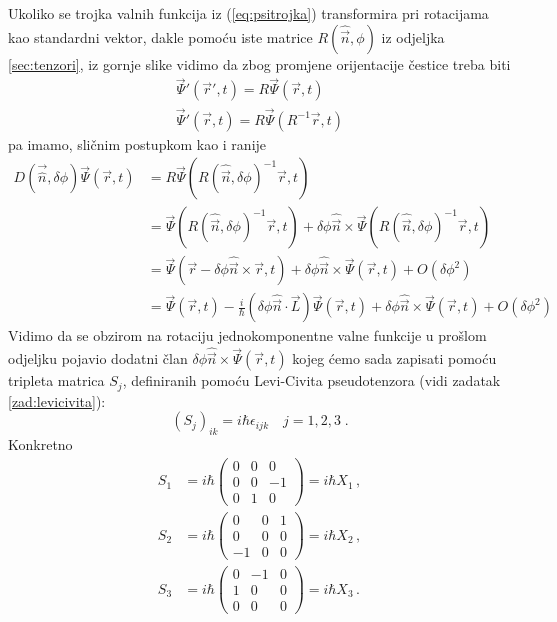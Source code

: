 Ukoliko se trojka valnih funkcija iz (\ref{eq:psitrojka}) transformira
pri rotacijama kao standardni vektor, dakle pomoću iste matrice $R(\hat{\vec{n}}, \phi)$
iz odjeljka \ref{sec:tenzori}, iz gornje slike vidimo da zbog promjene
orijentacije čestice treba biti
\begin{gather*}
\vec{\Psi}'(\vec{r}',t)=R \vec{\Psi}(\vec{r},t) \\
\vec{\Psi}'(\vec{r},t)=R \vec{\Psi}(R^{-1}\vec{r},t) 
\end{gather*}
pa imamo, sličnim postupkom kao i ranije
\begin{equation*}
\begin{split}
D(\vec{\hat{n}},\delta\phi)\vec{\Psi}(\vec{r}, t)&=
 R \vec{\Psi}(R(\hat{\vec{n}},\delta \phi)^{-1}
\vec{r}, t) \\
 &=\vec{\Psi}(R(\hat{\vec{n}}, \delta\phi)^{-1}\vec{r}, t)+
\delta\phi \hat{\vec{n}}\times\vec{\Psi}(
R(\hat{\vec{n}}, \delta\phi)^{-1}\vec{r},t) \\
 &=\vec{\Psi}(\vec{r}-\delta\phi\hat{\vec{n}}\times\vec{r}, t)+
\delta\phi \hat{\vec{n}}\times\vec{\Psi}(\vec{r},t) + O(\delta\phi^2) \\
 &= \vec{\Psi}(\vec{r}, t)-\frac{i}{\hbar}(\delta\phi\hat{\vec{n}}\cdot
  \vec{L})\vec{\Psi}(\vec{r}, t)+
\delta\phi \hat{\vec{n}}\times\vec{\Psi}(\vec{r},t) + O(\delta\phi^2)
\end{split}
\end{equation*}
Vidimo da se obzirom na rotaciju jednokomponentne valne funkcije u prošlom
odjeljku pojavio dodatni član $\delta\phi \hat{\vec{n}}\times\vec{\Psi}(\vec{r},t)$
kojeg ćemo sada zapisati pomoću tripleta matrica $S_{j}$,
definiranih pomoću Levi-Civita pseudotenzora (vidi zadatak \ref{zad:levicivita}):
\begin{equation}
(S_j)_{ik} = i\hbar\epsilon_{ijk} \quad j=1,2,3 \;.
\end{equation}
Konkretno
\begin{align}
S_1& =i\hbar
\begin{pmatrix}
0 & 0 & 0 \\
0 & 0 &-1 \\
0 & 1 & 0
\end{pmatrix} = i\hbar X_1 \,,\\
S_2& = i\hbar
\begin{pmatrix}
0 & 0 & 1 \\
0 & 0 & 0 \\
-1 & 0 & 0
\end{pmatrix} = i\hbar X_2 \,, \\
S_3& = i\hbar
\begin{pmatrix}
0 & -1 & 0 \\
1 & 0 & 0\\
0 & 0 & 0
\end{pmatrix} = i\hbar X_3 \,.
\end{align}

